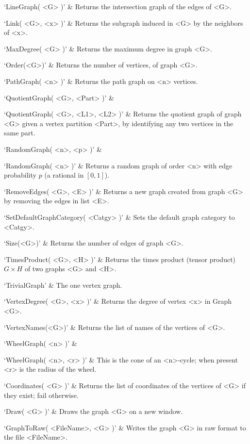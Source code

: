`LineGraph( <G> )' & 
Returns the intersection graph of the edges of <G>.

`Link( <G>, <x> )' & 
Returns the subgraph induced in <G> by the neighbors of <x>.

`MaxDegree( <G> )' & 
Returns the maximum degree in graph <G>.

`Order(<G>)' & 
Returns the number of vertices, of graph <G>.

`PathGraph( <n> )' & 
Returns the path graph on <n> vertices.

`QuotientGraph( <G>, <Part> )' & 

`QuotientGraph( <G>, <L1>, <L2> )' & 
Returns the quotient graph of graph <G> given a vertex partition <Part>, by identifying any two vertices in the same part.

`RandomGraph( <n>, <p> )' & 

`RandomGraph( <n> )' & 
Returns a random graph of order <n> with edge probability $p$ (a rational in $[0,1]$).

`RemoveEdges( <G>, <E> )' & 
Returns  a  new graph created from graph <G> by removing the edges in list <E>.

`SetDefaultGraphCategory( <Catgy> )' & 
Sets  the default graph category to <Catgy>.

`Size(<G>)' & 
Returns the number of edges of graph <G>.

`TimesProduct( <G>, <H> )' & 
Returns  the  times  product (tensor product) $G  \times  H$ of two graphs <G> and <H>.

`TrivialGraph' & 
The one vertex graph.

`VertexDegree( <G>, <x> )' & 
Returns the degree of vertex <x> in Graph <G>.

`VertexNames(<G>)' & 
Returns  the  list of names of the vertices of <G>.

`WheelGraph( <n> )' & 

`WheelGraph( <n>, <r> )' & 
This  is  the   cone  of  an  <n>-cycle; when present <r> is the radius of the wheel.
\enditems


\beginitems
`Coordinates( <G> )' & 
Returns the list of coordinates of the vertices of <G> if they exist; fail otherwise.

`Draw( <G> )' &
Draws the graph <G> on a new window.

`GraphToRaw( <FileName>, <G> )' &
Writes the graph <G> in raw format to the file  <FileName>.

